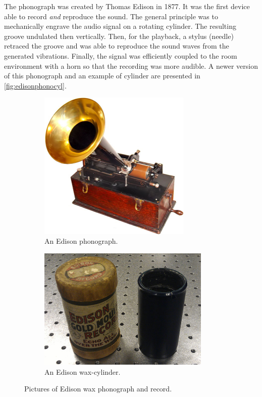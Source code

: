 The phonograph was created by Thomas Edison in 1877. It was the first device able to record \emph{and} reproduce the sound. The general principle was to mechanically engrave the audio signal on a rotating cylinder. The resulting groove undulated then vertically. Then, for the playback, a stylus (needle) retraced the groove and was able to reproduce the sound waves from the generated vibrations. Finally, the signal was efficiently coupled to the room environment with a horn so that the recording was more audible. A newer version of this phonograph and an example of cylinder are presented in \autoref{fig:edisonphonocyl}.

\begin{figure}[!ht]
    \begin{subfigure}[b]{0.45\textwidth}
    \centering
    \includegraphics[width=0.8\textwidth]{images/edison-phonograph}
    \caption{An Edison phonograph.}
    \label{fig:edisonphono}
    \end{subfigure}
    \begin{subfigure}[b]{0.45\textwidth}
    \centering
    \includegraphics[width=0.9\textwidth]{images/edison-cylinder}
    \caption{An Edison wax-cylinder.}
    \label{fig:edisoncyl}
    \end{subfigure}
    \caption{Pictures of Edison wax phonograph and record.}
    \label{fig:edisonphonocyl}
\end{figure}

